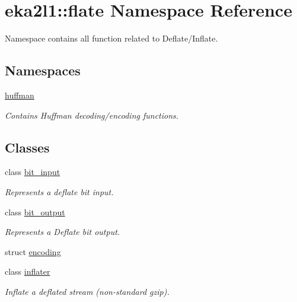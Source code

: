 \hypertarget{namespaceeka2l1_1_1flate}{}\section{eka2l1\+:\+:flate Namespace Reference}
\label{namespaceeka2l1_1_1flate}


Namespace contains all function related to Deflate/\+Inflate.  


\subsection*{Namespaces}
\begin{DoxyCompactItemize}
\item 
 \mbox{\hyperlink{namespaceeka2l1_1_1flate_1_1huffman}{huffman}}
\begin{DoxyCompactList}\small\item\em Contains Huffman decoding/encoding functions. \end{DoxyCompactList}\end{DoxyCompactItemize}
\subsection*{Classes}
\begin{DoxyCompactItemize}
\item 
class \mbox{\hyperlink{classeka2l1_1_1flate_1_1bit__input}{bit\+\_\+input}}
\begin{DoxyCompactList}\small\item\em Represents a deflate bit input. \end{DoxyCompactList}\item 
class \mbox{\hyperlink{classeka2l1_1_1flate_1_1bit__output}{bit\+\_\+output}}
\begin{DoxyCompactList}\small\item\em Represents a Deflate bit output. \end{DoxyCompactList}\item 
struct \mbox{\hyperlink{structeka2l1_1_1flate_1_1encoding}{encoding}}
\item 
class \mbox{\hyperlink{classeka2l1_1_1flate_1_1inflater}{inflater}}
\begin{DoxyCompactList}\small\item\em Inflate a deflated stream (non-\/standard gzip). \end{DoxyCompactList}\end{DoxyCompactItemize}
